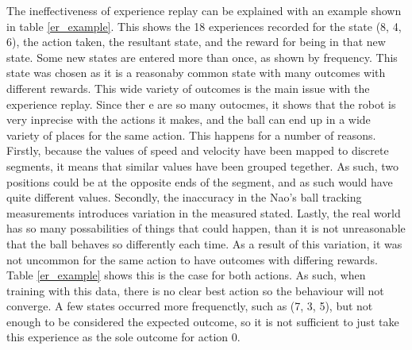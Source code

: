 \documentclass[12pt,a4paper]{article}
\begin{document}
The ineffectiveness of experience replay can be explained with an example shown in table \ref{er_example}. This shows the 18 experiences recorded for the state (8, 4, 6), the action taken, the resultant state, and the reward for being in that new state. Some new states are entered more than once, as shown by frequency. This state was chosen as it is a reasonaby common state with many outcomes with different rewards. This wide variety of outcomes is the main issue with the experience replay. Since ther e are so many outocmes, it shows that the robot is very inprecise with the actions it makes, and the ball can end up in a wide variety of places for the same action. This happens for a number of reasons. Firstly, because the values of speed and velocity have been mapped to discrete segments, it means that similar values have been grouped tegether. As such, two positions could be at the opposite ends of the segment, and as such would have quite different values. Secondly, the inaccuracy in the Nao's ball tracking measurements introduces variation in the measured stated. Lastly, the real world has so many possabilities of things that could happen, than it is not unreasonable that the ball behaves so differently each time. As a result of this variation, it was not uncommon for the same action to have outcomes with differing rewards. Table \ref{er_example} shows this is the case for both actions. As such, when training with this data, there is no clear best action so the behaviour will not converge. A few states occurred more frequenctly, such as (7, 3, 5), but not enough to be considered the expected outcome, so it is not sufficient to just take this experience as the sole outcome for action 0. 

\end{document}
